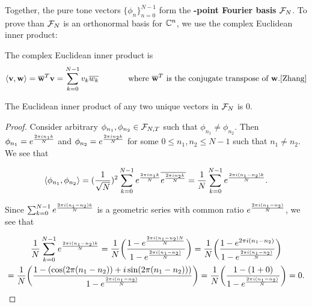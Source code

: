 \par Together, the pure tone vectors $\{\phi_n\}_{n=0}^{N-1}$ form the \textbf{-point Fourier basis} $\mathcal{F}_N$. To prove than $\mathcal{F}_N$ is an orthonormal basis for $\mathbb{C}^n$, we use the complex Euclidean inner product:

\begin{definition}
    The complex Euclidean inner product is
    $$\langle \mathbf{v},\mathbf{w} \rangle = \overline{\mathbf{w}}^T\mathbf{v} = \sum_{k=0}^{N-1} v_k\overline{w_k} \hspace{.5in} \text{where } \overline{\mathbf{w}}^T \text{ is the conjugate transpose of } \mathbf{w}.\cite{Zhang}$$
\end{definition}



\begin{lemma}
    The Euclidean inner product of any two unique vectors in $\mathcal{F}_N$ is 0.\\
    
    \begin{proof}
        Consider arbitrary $\phi_{n_1},\phi_{n_2} \in \mathcal{F}_{N,T}$ such that $\phi_{n_1} \not= \phi_{n_2}$. Then $\phi_{n_1} = e^{\frac{2 \pi i n_1k}{N}}$ and $\phi_{n_2} = e^{\frac{2 \pi i n_2k}{N}}$ for some $0 \le n_1,n_2 \le N-1$ such that $n_1 \not= n_2$. We see that 
    
        \[
           \langle \phi_{n_1},\phi_{n_2} \rangle = (\frac{1}{\sqrt{N}})^2 \sum_{k=0}^{N-1} e^{\frac{2 \pi i n_1k}{N}}\overline{e^{\frac{2 \pi i n_2k}{N}}} = \frac{1}{N} \sum_{k=0}^{N-1} e^{\frac{2 \pi i (n_1-n_2)k}{N}}.
        \]
        
        Since $\sum_{k=0}^{N-1} e^{\frac{2 \pi i (n_1-n_2)k}{N}}$ is a geometric series with common ratio $e^{\frac{2 \pi i (n_1-n_2)}{N}}$, we see that
        
        \begin{multline*}
            \frac{1}{N} \sum_{k=0}^{N-1} e^{\frac{2 \pi i (n_1-n_2)k}{N}} = \frac{1}{N} \bigg(\frac{1-e^{\frac{2 \pi i (n_1-n_2)N}{N}}}{1-e^{\frac{2 \pi i (n_1-n_2)}{N}}}\bigg) = \frac{1}{N} \bigg(\frac{1-e^{2\pi i(n_1-n_2)}}{1-e^{\frac{2 \pi i (n_1-n_2)}{N}}}\bigg)\\ = \frac{1}{N} \bigg(\frac{1-(\cos(2\pi(n_1-n_2))+i\sin(2\pi(n_1-n_2)))}{1-e^{\frac{2 \pi i (n_1-n_2)}{N}}}\bigg) = \frac{1}{N} \bigg(\frac{1-(1+0)}{1-e^{\frac{2 \pi i (n_1-n_2)}{N}}}\bigg) = 0.
        \end{multline*}
    \end{proof}

    \label{lem:FN_is_ortho}
\end{lemma}

